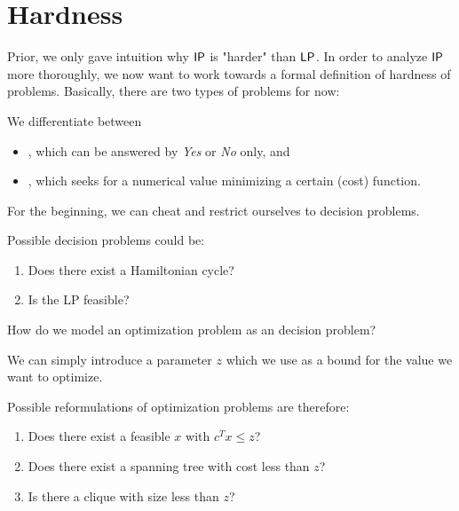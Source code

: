 \section{Hardness}
Prior, we only gave intuition why $\mathsf{IP}$ is "harder" than $\mathsf{LP}$.
In order to analyze $\mathsf{IP}$ more thoroughly, we now want to work towards a formal definition of hardness of problems.
Basically, there are two types of problems for now:
\begin{definition}
    We differentiate between
    \begin{itemize}
        \item {}, which can be answered by \emph{Yes} or \emph{No} only, and
        \item {}, which seeks for a numerical value minimizing a certain (cost) function.
    \end{itemize}
\end{definition}
For the beginning, we can cheat and restrict ourselves to decision problems.
\begin{example} Possible decision problems could be:
    \begin{enumerate}
        \item Does there exist a Hamiltonian cycle?
        \item Is the LP feasible?
    \end{enumerate}
\end{example}
\begin{question}
    How do we model an optimization problem as an decision problem?
\end{question}
\begin{answer}
    We can simply introduce a parameter $z$ which we use as a bound for the value we want to optimize.
\end{answer}
\begin{example} Possible reformulations of optimization problems are therefore:
    \begin{enumerate}
        \item Does there exist a feasible $x$ with $c^Tx \leq z$?
        \item Does there exist a spanning tree with cost less than $z$?
        \item Is there a clique with size less than $z$?
    \end{enumerate}
\end{example}
